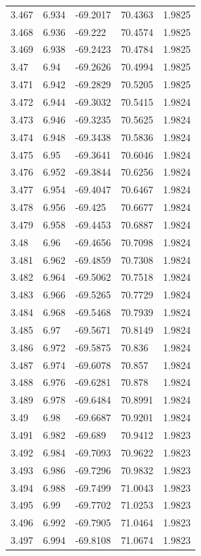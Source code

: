 \begin{tabular}{lllll}
3.467 & 6.934 & -69.2017 & 70.4363 & 1.9825 \\
3.468 & 6.936 & -69.222 & 70.4574 & 1.9825 \\
3.469 & 6.938 & -69.2423 & 70.4784 & 1.9825 \\
3.47 & 6.94 & -69.2626 & 70.4994 & 1.9825 \\
3.471 & 6.942 & -69.2829 & 70.5205 & 1.9825 \\
3.472 & 6.944 & -69.3032 & 70.5415 & 1.9824 \\
3.473 & 6.946 & -69.3235 & 70.5625 & 1.9824 \\
3.474 & 6.948 & -69.3438 & 70.5836 & 1.9824 \\
3.475 & 6.95 & -69.3641 & 70.6046 & 1.9824 \\
3.476 & 6.952 & -69.3844 & 70.6256 & 1.9824 \\
3.477 & 6.954 & -69.4047 & 70.6467 & 1.9824 \\
3.478 & 6.956 & -69.425 & 70.6677 & 1.9824 \\
3.479 & 6.958 & -69.4453 & 70.6887 & 1.9824 \\
3.48 & 6.96 & -69.4656 & 70.7098 & 1.9824 \\
3.481 & 6.962 & -69.4859 & 70.7308 & 1.9824 \\
3.482 & 6.964 & -69.5062 & 70.7518 & 1.9824 \\
3.483 & 6.966 & -69.5265 & 70.7729 & 1.9824 \\
3.484 & 6.968 & -69.5468 & 70.7939 & 1.9824 \\
3.485 & 6.97 & -69.5671 & 70.8149 & 1.9824 \\
3.486 & 6.972 & -69.5875 & 70.836 & 1.9824 \\
3.487 & 6.974 & -69.6078 & 70.857 & 1.9824 \\
3.488 & 6.976 & -69.6281 & 70.878 & 1.9824 \\
3.489 & 6.978 & -69.6484 & 70.8991 & 1.9824 \\
3.49 & 6.98 & -69.6687 & 70.9201 & 1.9824 \\
3.491 & 6.982 & -69.689 & 70.9412 & 1.9823 \\
3.492 & 6.984 & -69.7093 & 70.9622 & 1.9823 \\
3.493 & 6.986 & -69.7296 & 70.9832 & 1.9823 \\
3.494 & 6.988 & -69.7499 & 71.0043 & 1.9823 \\
3.495 & 6.99 & -69.7702 & 71.0253 & 1.9823 \\
3.496 & 6.992 & -69.7905 & 71.0464 & 1.9823 \\
3.497 & 6.994 & -69.8108 & 71.0674 & 1.9823 \\

\end{tabular}

